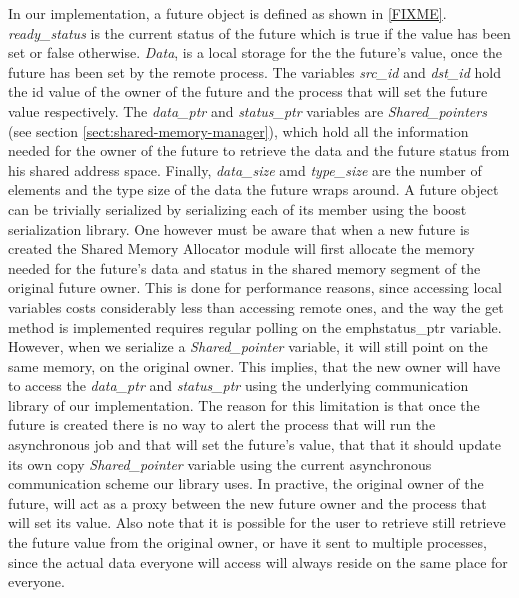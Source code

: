 In our implementation, a future object is defined as shown in \ref{FIXME}.  \emph{ready\_status} is the current
status of the future which is true if the value has been set or false otherwise.  \emph{Data}, is a local storage for the
the future's value, once the future has been set by the remote process.  The variables \emph{src\_id} and \emph{dst\_id}
hold the id value of the owner of the future and the process that will set the future value respectively.  
The \emph{data\_ptr} and \emph{status\_ptr} variables are \emph{Shared\_pointers} (see section \ref{sect:shared-memory-manager}),
which hold all the
information needed for the owner of the future to retrieve the data and the future status from his shared address space. 
Finally, \emph{data\_size} amd \emph{type\_size} are the number of elements and the
type size of the data the future wraps around.  A future object can be trivially serialized by serializing each
of its member using the boost serialization library.  One however must be aware that when a new future is created
the Shared Memory Allocator module will first allocate the memory needed for the future's data and status in the 
shared memory segment of the original future owner.  This is done for performance reasons, since accessing local
variables costs considerably less than accessing remote ones, and the way the get method is implemented requires 
regular polling on the emph{status\_ptr} variable.  However, when we serialize a \emph{Shared\_pointer} variable,
it will still point on the same memory, on the original owner.  This implies, that the new owner will have to 
access the \emph{data\_ptr} and \emph{status\_ptr} using the underlying communication library of our implementation.
The reason for this limitation is that once the future is created there is no way to alert the process that will
run the asynchronous job and that will set the future's value, that that it should update its own copy \emph{Shared\_pointer}
variable using the current asynchronous communication scheme our library uses.  In practive, the original owner of the
future, will act as a proxy between the new future owner and the process that will set its value.  Also note that it is
possible for the user to retrieve still retrieve the future value from the original owner, or have it sent to multiple
processes, since the actual data everyone will access will always reside on the same place for everyone.
   

